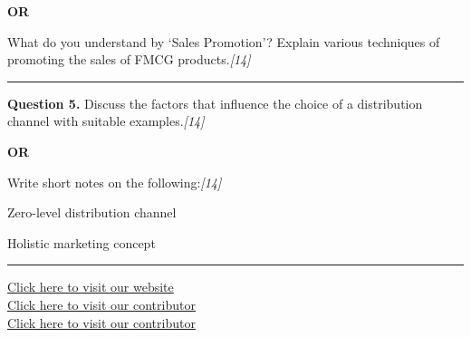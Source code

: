 \documentclass[11pt,a4paper]{article}
\newcommand{\pts}[1]{\hfill   \textit{[#1]}}
\begin{document}
\centerline{   \textbf{OR}}

What do you understand by `Sales Promotion'? Explain various techniques of promoting the sales of FMCG products.\pts{14}

\medskip\rule{\linewidth}{0.2pt}




\noindent   \textbf{Question 5.}
Discuss the factors that influence the choice of a distribution channel with suitable examples.\pts{14}

\centerline{   \textbf{OR}}

Write short notes on the following:\pts{14}

\begin{parts}
  \item Zero-level distribution channel
  \item Holistic marketing concept
\end{parts}

\vfill
\rule{\linewidth}{0.4pt}

\begin{center}\small
\href{https://bhu-exam.vercel.app/}{Click here to visit our website}\\[4pt]
\href{https://me-aryan.vercel.app/}{Click here to visit our contributor}\\[4pt]
\href{https://quashan-me.vercel.app/}{Click here to visit our contributor}
\end{center}
\end{document}
